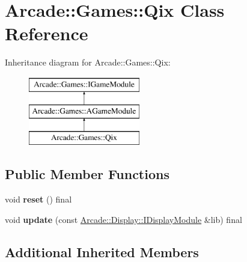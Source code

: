 \hypertarget{classArcade_1_1Games_1_1Qix}{}\section{Arcade\+::Games\+::Qix Class Reference}
\label{classArcade_1_1Games_1_1Qix}
Inheritance diagram for Arcade\+::Games\+::Qix\+:\begin{figure}[H]
\begin{center}
\leavevmode
\includegraphics[height=3.000000cm]{classArcade_1_1Games_1_1Qix}
\end{center}
\end{figure}
\subsection*{Public Member Functions}
\begin{DoxyCompactItemize}
\item 
\mbox{\label{classArcade_1_1Games_1_1Qix_a7d3a6ced1c867ee297a5777db3ff1e12}} 
void {\bfseries reset} () final
\item 
\mbox{\label{classArcade_1_1Games_1_1Qix_aab6bfb0ecf8571da19c4fcbfc9de263e}} 
void {\bfseries update} (const \mbox{\hyperlink{classArcade_1_1Display_1_1IDisplayModule}{Arcade\+::\+Display\+::\+I\+Display\+Module}} \&lib) final
\end{DoxyCompactItemize}
\subsection*{Additional Inherited Members}
